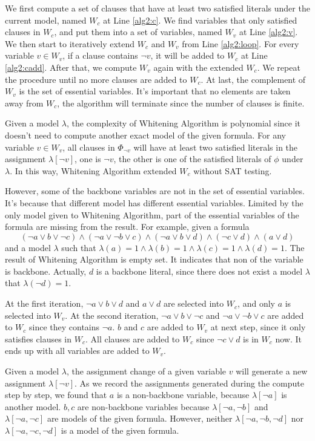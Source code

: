 We first compute a set of clauses that have at least two satisfied literals under the current model, named $W_c$ at Line \ref{alg2:c}. We find variables that only satisfied clauses in $W_c$, and put them into a set of variables, named $W_v$ at Line \ref{alg2:v}. We then start to iteratively extend $W_c$ and $W_v$ from Line \ref{alg2:loop}. For every variable $v\in W_v$, if a clause contains $\neg v$, it will be added to $W_c$ at Line \ref{alg2:cadd}. After that, we compute $W_v$ again with the extended $W_c$. We repeat the procedure until no more clauses are added to $W_c$. At last, the complement of $W_v$ is the set of essential variables. It's important that no elements are taken away from $W_c$, the algorithm will terminate since the number of clauses is finite.

Given a model $\lambda$, the complexity of Whitening Algorithm is polynomial since it doesn't need to compute another exact model of the given formula. For any variable $v\in W_v$, all clauses in $\Phi_{\neg v}$ will have at least two satisfied literals in the assignment $\lambda[\neg v]$, one is $\neg v$, the other is one of the satisfied literals of $\phi$ under $\lambda$. In this way, Whitening Algorithm extended $W_c$ without SAT testing.

However, some of the backbone variables are not in the set of essential variables. It's because that different model has different essential variables. Limited by the only model given to Whitening Algorithm, part of the essential variables of the formula are missing from the result. For example, given a formula
\[(\neg a\vee b\vee\neg c)\wedge(\neg a\vee\neg b\vee c)\wedge(\neg a\vee b\vee d)\wedge(\neg c\vee d)\wedge(a\vee d)\]
and a model $\lambda$ such that $\lambda(a)=1\wedge \lambda(b)=1\wedge \lambda(c)=1\wedge \lambda(d)=1$. The result of Whitening Algorithm is empty set. It indicates that non of the variable is backbone. Actually, $d$ is a backbone literal, since there does not exist a model $\lambda$ that $\lambda(\neg d)=1$.

At the first iteration, $\neg a\vee b\vee d$ and $a\vee d$ are selected into $W_c$, and only $a$ is selected into $W_v$. At the second iteration, $\neg a\vee b\vee \neg c$ and $\neg a\vee\neg b\vee c$ are added to $W_c$ since they contains $\neg a$. $b$ and $c$ are added to $W_v$ at next step, since it only satisfies clauses in $W_c$. All clauses are added to $W_c$ since $\neg c\vee d$ is in $W_c$ now. It ends up with all variables are added to $W_v$.

Given a model $\lambda$, the assignment change of a given variable $v$ will generate a new assignment $\lambda[\neg v]$. As we record the assignments generated during the compute step by step, we found that $a$ is a non-backbone variable, because $\lambda[\neg a]$ is another model. $b,c$ are non-backbone variables because $\lambda[\neg a,\neg b]$ and $\lambda[\neg a,\neg c]$ are models of the given formula. However, neither $\lambda[\neg a,\neg b,\neg d]$ nor $\lambda[\neg a,\neg c,\neg d]$ is a model of the given formula.

